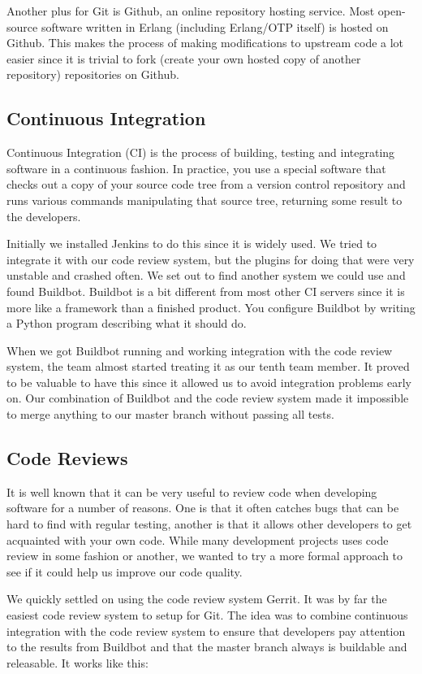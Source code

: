 \documentclass[11pt,a4paper]{report}
\begin{document}
Another plus for Git is Github, an online repository hosting service. Most
open-source software written in Erlang (including Erlang/OTP itself) is hosted
on Github. This makes the process of making modifications to upstream code a lot
easier since it is trivial to fork (create your own hosted copy of another
repository) repositories on Github.
\subsection{Continuous Integration}
Continuous Integration (CI) is the process of building, testing and integrating
software in a continuous fashion. In practice, you use a special software that
checks out a copy of your source code tree from a version control repository and
runs various commands manipulating that source tree, returning some result to
the developers.

Initially we installed Jenkins to do this since it is widely used. We tried to
integrate it with our code review system, but the plugins for doing that were
very unstable and crashed often. We set out to find another system we could use
and found Buildbot. Buildbot is a bit different from most other CI servers since
it is more like a framework than a finished product. You configure Buildbot by
writing a Python program describing what it should do.

When we got Buildbot running and working integration with the code review
system, the team almost started treating it as our tenth team member. It proved
to be valuable to have this since it allowed us to avoid integration problems
early on. Our combination of Buildbot and the code review system made it
impossible to merge anything to our master branch without passing all tests.
\subsection{Code Reviews}
It is well known that it can be very useful to review code when developing
software for a number of reasons. One is that it often catches bugs that can be
hard to find with regular testing, another is that it allows other developers to
get acquainted with your own code. While many development projects uses code
review in some fashion or another, we wanted to try a more formal approach to
see if it could help us improve our code quality.

We quickly settled on using the code review system Gerrit. It was by far the
easiest code review system to setup for Git. The idea was to combine continuous
integration with the code review system to ensure that developers pay attention
to the results from Buildbot and that the master branch always is buildable and
releasable. It works like this:
\end{document}
